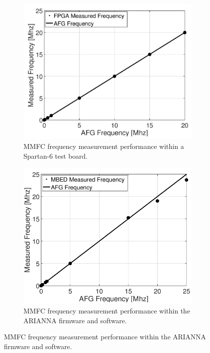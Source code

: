 \documentclass[journal]{IEEEtran}
\begin{document}
\begin{figure}[!htb]
	
	\begin{subfigure}[t]{0.5\linewidth}
		\centering
		\includegraphics[scale=0.4]{fpgaff.png}
		\caption{MMFC frequency measurement performance within a Spartan-6 test board.}
	\end{subfigure}
	\hfill
	\begin{subfigure}[t]{0.5\linewidth}
		\centering
		\includegraphics[scale=0.4]{mbedff.png}
		\caption{MMFC frequency measurement performance within the ARIANNA firmware and software.}
	\end{subfigure}


\end{figure}
\end{document}
